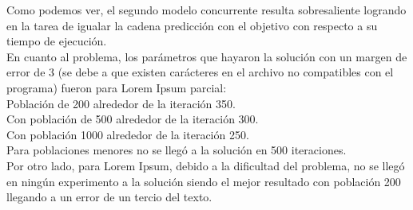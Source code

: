 \documentclass[a4paper,twocolumn,10pt]{article}
\begin{document}
\begin{table}[h]
\caption{Proporción entre el tiempo de ejecución del modelo secuencial frente a los distintos modelos}
\end{table}
Como podemos ver, el segundo modelo concurrente resulta sobresaliente logrando en la tarea de igualar la cadena predicción con el objetivo con respecto a su tiempo de ejecución.\\
En cuanto al problema, los parámetros que hayaron la solución con un margen de error de 3 (se debe a que existen carácteres en el archivo no compatibles con el programa) fueron para Lorem Ipsum parcial: \\
Población de 200 alrededor de la iteración 350.\\
Con población de 500 alrededor de la iteración 300.\\
Con población 1000 alrededor de la iteración 250.\\
Para poblaciones menores no se llegó a la solución en 500 iteraciones.\\
Por otro lado, para Lorem Ipsum, debido a la dificultad del problema, no se llegó en ningún experimento a la solución siendo el mejor resultado con población 200 llegando a un error de un tercio del texto. 
\end{document}

